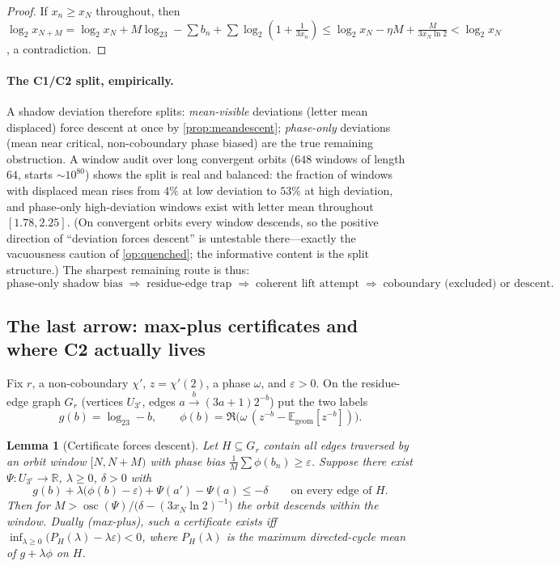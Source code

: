 \documentclass[11pt]{article}
\newcommand{\E}{\mathbb{E}}
\newcommand{\R}{\mathbb{R}}
\theoremstyle{plain}
\newtheorem{lemma}{Lemma}
\theoremstyle{definition}
\theoremstyle{remark}
\begin{document}
\begin{proof}
If $x_n\ge x_N$ throughout, then
$\log_2x_{N+M}=\log_2x_N+M\log_23-\sum b_n+\sum\log_2(1+\tfrac1{3x_n})
\le\log_2x_N-\eta M+\tfrac M{3x_N\ln2}<\log_2x_N$, a contradiction.
\end{proof}

\paragraph{The C1/C2 split, empirically.} A shadow deviation therefore
splits: \emph{mean-visible} deviations (letter mean displaced) force
descent at once by \cref{prop:meandescent}; \emph{phase-only}
deviations (mean near critical, non-coboundary phase biased) are the
true remaining obstruction. A window audit over long convergent orbits
($648$ windows of length $64$, starts $\sim10^{80}$) shows the split is
real and balanced: the fraction of windows with displaced mean rises
from $4\%$ at low deviation to $53\%$ at high deviation, and phase-only
high-deviation windows exist with letter mean throughout
$[1.78,2.25]$. (On convergent orbits every window descends, so the
positive direction of ``deviation forces descent'' is untestable
there---exactly the vacuousness caution of \cref{op:quenched}; the
informative content is the split structure.) The sharpest remaining
route is thus:
\[
\text{phase-only shadow bias}
\;\Rightarrow\;
\text{residue-edge trap}
\;\Rightarrow\;
\text{coherent lift attempt}
\;\Rightarrow\;
\text{coboundary (excluded) or descent}.
\]

\subsection*{The last arrow: max-plus certificates and where C2 actually lives}

Fix $r$, a non-coboundary $\chi'$, $z=\chi'(2)$, a phase $\omega$, and
$\varepsilon>0$. On the residue-edge graph $G_r$ (vertices $U_{3^r}$,
edges $a\xrightarrow{b}(3a+1)2^{-b}$) put the two labels
\[
g(b)=\log_23-b,
\qquad
\phi(b)=\Re\bigl(\omega\,(z^{-b}-\E_{\mathrm{geom}}[z^{-b}])\bigr).
\]

\begin{lemma}[Certificate forces descent]\label{lem:cert}
Let $H\subseteq G_r$ contain all edges traversed by an orbit window
$[N,N+M)$ with phase bias $\frac1M\sum\phi(b_n)\ge\varepsilon$. Suppose
there exist $\Psi:U_{3^r}\to\R$, $\lambda\ge0$, $\delta>0$ with
\[
g(b)+\lambda\bigl(\phi(b)-\varepsilon\bigr)+\Psi(a')-\Psi(a)\le-\delta
\qquad\text{on every edge of }H .
\]
Then for $M>\operatorname{osc}(\Psi)/\bigl(\delta-(3x_N\ln2)^{-1}\bigr)$
the orbit descends within the window. Dually (max-plus), such a
certificate exists iff
$\inf_{\lambda\ge0}\bigl(P_H(\lambda)-\lambda\varepsilon\bigr)<0$, where
$P_H(\lambda)$ is the maximum directed-cycle mean of $g+\lambda\phi$ on
$H$.
\end{lemma}
\end{document}
